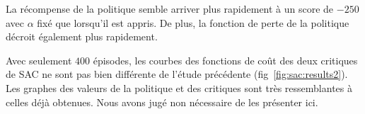 La récompense de la politique semble arriver plus rapidement à un score de $-250$ avec $\alpha$ fixé que lorsqu'il est appris. De plus, la fonction de perte de la politique décroit également plus rapidement. 

Avec seulement $400$ épisodes, les courbes des fonctions de coût des deux critiques de SAC ne sont pas bien différente de l'étude précédente (fig~\ref{fig:sac:results2}). Les graphes des valeurs de la politique et des critiques sont très ressemblantes à celles déjà obtenues. Nous avons jugé non nécessaire de les présenter ici.